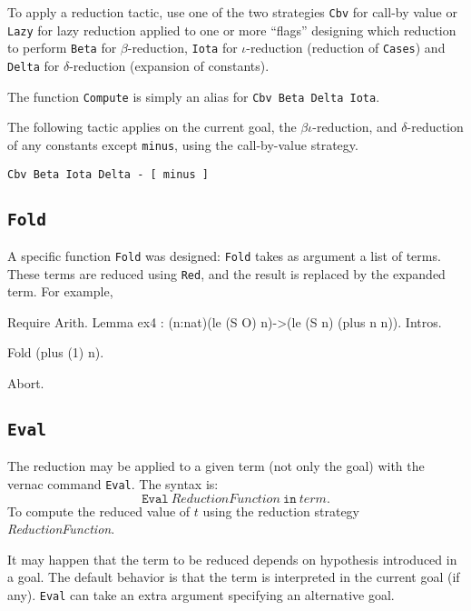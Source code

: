 \documentclass[11pt]{article}
\begin{document}
\begin{coq_example*}
To apply a reduction tactic, use one of the two strategies
\texttt{Cbv} for call-by value or \texttt{Lazy} for lazy reduction
applied to one or more ``flags'' designing which reduction to perform 
\texttt{Beta} for $\beta$-reduction, \texttt{Iota} for
$\iota$-reduction (reduction of \texttt{Cases}) and \texttt{Delta} for
$\delta$-reduction (expansion of constants).

The function  \verb!Compute! is simply an alias for
\verb!Cbv Beta Delta Iota!. 

The following tactic applies on the current goal, 
the $\beta\iota$-reduction, and
$\delta$-reduction of any constants except \verb!minus!, using the
call-by-value strategy.
\begin{verbatim}
Cbv Beta Iota Delta - [ minus ]
\end{verbatim}

\subsection{\texttt{Fold}}
A specific function \verb!Fold!  was designed:
\verb!Fold! takes as argument a list of
terms. These terms are reduced using \verb!Red!, and the result is
replaced by the expanded term. For example,
\begin{coq_example*}
Require Arith.
Lemma ex4 : (n:nat)(le (S O) n)->(le (S n) (plus n n)).
Intros.
\end{coq_example*}
\begin{coq_example}
Fold (plus (1) n).
\end{coq_example}
\begin{coq_eval}
Abort.
\end{coq_eval}

\subsection{\texttt{Eval}}

The reduction may be applied to a given term (not only the goal) with
the vernac command \verb!Eval!. 
The syntax is:
\[\texttt{Eval}~ \textit{ReductionFunction}~ \texttt{in}~
\textit{term}.\]
To compute the reduced value of $t$ using the reduction strategy 
\textit{ReductionFunction}.

It may happen that the term to be
reduced depends on hypothesis introduced in a goal. The default
behavior is that the term is interpreted in the current goal (if
any). \texttt{Eval} can take an extra argument specifying an
alternative goal.


\end{coq_example*}
\end{document}
